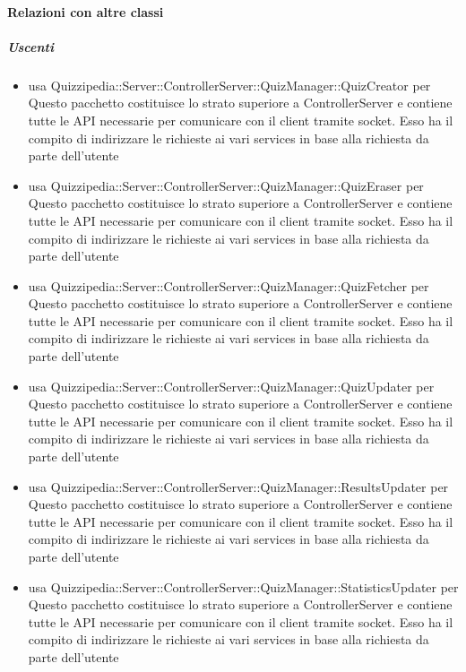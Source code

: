 \paragraph{Relazioni con altre classi}
\subparagraph{Uscenti}
\begin{itemize}
\item usa Quizzipedia::Server::ControllerServer::QuizManager::QuizCreator per Questo pacchetto costituisce lo strato superiore a ControllerServer e contiene tutte le API necessarie per comunicare con il client tramite socket. Esso ha il compito di indirizzare le richieste ai vari services in base alla richiesta da parte dell'utente
\item usa Quizzipedia::Server::ControllerServer::QuizManager::QuizEraser per Questo pacchetto costituisce lo strato superiore a ControllerServer e contiene tutte le API necessarie per comunicare con il client tramite socket. Esso ha il compito di indirizzare le richieste ai vari services in base alla richiesta da parte dell'utente
\item usa Quizzipedia::Server::ControllerServer::QuizManager::QuizFetcher per Questo pacchetto costituisce lo strato superiore a ControllerServer e contiene tutte le API necessarie per comunicare con il client tramite socket. Esso ha il compito di indirizzare le richieste ai vari services in base alla richiesta da parte dell'utente
\item usa Quizzipedia::Server::ControllerServer::QuizManager::QuizUpdater per Questo pacchetto costituisce lo strato superiore a ControllerServer e contiene tutte le API necessarie per comunicare con il client tramite socket. Esso ha il compito di indirizzare le richieste ai vari services in base alla richiesta da parte dell'utente
\item usa Quizzipedia::Server::ControllerServer::QuizManager::ResultsUpdater per Questo pacchetto costituisce lo strato superiore a ControllerServer e contiene tutte le API necessarie per comunicare con il client tramite socket. Esso ha il compito di indirizzare le richieste ai vari services in base alla richiesta da parte dell'utente
\item usa Quizzipedia::Server::ControllerServer::QuizManager::StatisticsUpdater per Questo pacchetto costituisce lo strato superiore a ControllerServer e contiene tutte le API necessarie per comunicare con il client tramite socket. Esso ha il compito di indirizzare le richieste ai vari services in base alla richiesta da parte dell'utente
\end{itemize}
